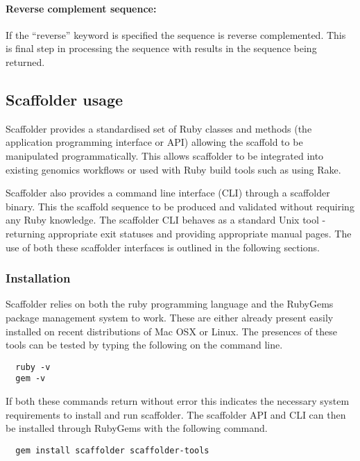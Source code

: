 \documentclass[10pt]{bmc_article}
\newenvironment{bmcformat}{\begin{raggedright}\baselineskip20pt\sloppy\setboolean{publ}{false}}{\end{raggedright}\baselineskip20pt\sloppy}
\begin{document}
\begin{bmcformat}
\paragraph{Reverse complement sequence:} If the ``reverse'' keyword is
specified the sequence is reverse complemented. This is final step in
processing the sequence with results in the sequence being returned. \pb

\subsection*{Scaffolder usage} %

Scaffolder provides a standardised set of Ruby classes and methods (the
application programming interface or API) allowing the scaffold to be
manipulated programmatically. This allows scaffolder to be integrated into
existing genomics workflows or used with Ruby build tools such as using Rake.
\pb

Scaffolder also provides a command line interface (CLI) through a scaffolder
binary. This the scaffold sequence to be produced and validated without
requiring any Ruby knowledge. The scaffolder CLI behaves as a standard Unix
tool - returning appropriate exit statuses and providing appropriate manual
pages. The use of both these scaffolder interfaces is outlined in the following
sections. \pb

\subsubsection*{Installation} %

Scaffolder relies on both the ruby programming language and the RubyGems
package management system to work. These are either already present easily
installed on recent distributions of Mac OSX or Linux. The presences of these
tools can be tested by typing the following on the command line. \pb

\begin{verbatim}
  ruby -v
  gem -v
\end{verbatim}

If both these commands return without error this indicates the necessary
system requirements to install and run scaffolder. The scaffolder API and CLI
can then be installed through RubyGems with the following command.

\begin{verbatim}
  gem install scaffolder scaffolder-tools
\end{verbatim}


\end{bmcformat}
\end{document}
